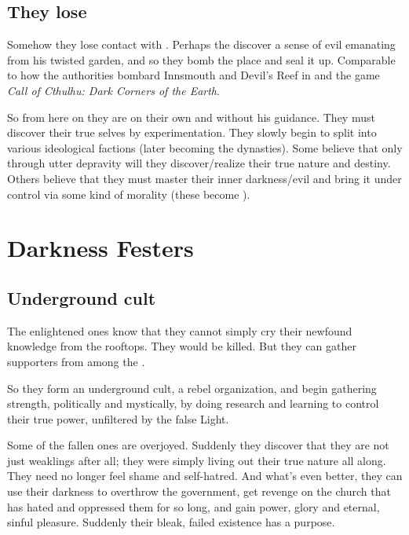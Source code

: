 \subsection{They lose \Semiza}
Somehow they lose contact with \Semiza. 
Perhaps the \Merkyrans{} discover a sense of evil emanating from his twisted garden, and so they bomb the place and seal it up. 
Comparable to how the authorities bombard Innsmouth and Devil's Reef in  and the game \emph{Call of Cthulhu: Dark Corners of the Earth}. 

So from here on they are on their own and without his guidance. 
They must discover their true selves by experimentation. 
They slowly begin to split into various ideological factions (later becoming the dynasties). 
Some believe that only through utter depravity will they discover/realize their true nature and destiny. 
Others believe that they must master their inner darkness/evil and bring it under control via some kind of morality (these become \KiriathSepher). 















\section{Darkness Festers}
\subsection{Underground cult}
The enlightened ones know that they cannot simply cry their newfound knowledge from the rooftops. They would be killed. But they can gather supporters from among the . 

So they form an underground cult, a rebel organization, and begin gathering strength, politically and mystically, by doing research and learning to control their true power, unfiltered by the false Light. 

Some of the fallen ones are overjoyed. Suddenly they discover that they are not just weaklings after all; they were simply living out their true nature all along. They need no longer feel shame and self-hatred. And what's even better, they can use their darkness to overthrow the government, get revenge on the church that has hated and oppressed them for so long, and gain power, glory and eternal, sinful pleasure. Suddenly their bleak, failed existence has a purpose. 


